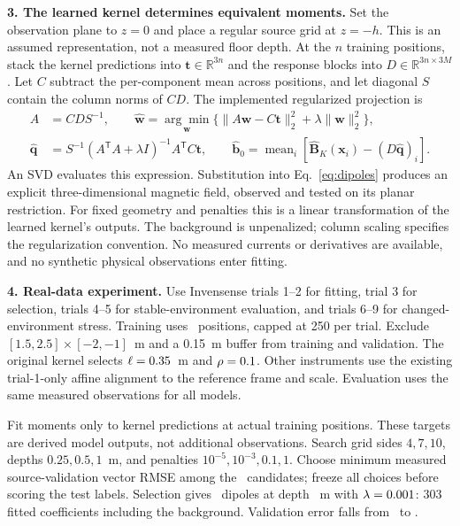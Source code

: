 \documentclass[11pt,letterpaper]{article}
\begin{document}
\newpage
\textbf{3. The learned kernel determines equivalent moments.}
Set the observation plane to $z=0$ and place a regular source grid at $z=-h$.
This is an assumed representation, not a measured floor depth. At the $n$ training
positions, stack the kernel predictions into $\mathbf t\in\mathbb R^{3n}$ and the
response blocks into $D\in\mathbb R^{3n\times3M}$.
Let $C$ subtract the per-component mean across positions, and let diagonal $S$
contain the column norms of $CD$. The implemented regularized projection is
\begin{align}
A&=CDS^{-1},\qquad
\widehat{\mathbf w}=
\underset{\mathbf w}{\arg\min}\bigl\{\|A\mathbf w-C\mathbf t\|_2^2
+\lambda\|\mathbf w\|_2^2\bigr\},\nonumber\\
\widehat{\mathbf q}&=S^{-1}(A^{\mathsf T}A+\lambda I)^{-1}A^{\mathsf T}C\mathbf t,
\qquad
\widehat{\mathbf b}_0=\operatorname{mean}_i
\left[\widehat{\mathbf B}_K(\mathbf x_i)-(D\widehat{\mathbf q})_i\right].
\label{eq:projection}
\end{align}
An SVD evaluates this expression. Substitution into Eq.~\eqref{eq:dipoles} produces
an explicit three-dimensional magnetic field, observed and tested on its planar
restriction. For fixed geometry and penalties this is a linear transformation
of the learned kernel's outputs. The background is unpenalized; column scaling
specifies the regularization convention. No measured currents or derivatives
are available, and no synthetic physical observations enter fitting.

\textbf{4. Real-data experiment.}
Use Invensense trials 1--2 for fitting, trial 3 for selection, trials 4--5 for
stable-environment evaluation, and trials 6--9 for changed-environment stress.
Training uses \TrainCount\ positions, capped at 250 per trial. Exclude
$[1.5,2.5]\times[-2,-1]$~m and a 0.15~m buffer from training and validation.
The original kernel selects $\ell=0.35$~m and $\rho=0.1$.
Other instruments use the existing trial-1-only affine alignment to the reference
frame and scale. Evaluation uses the same measured observations for all models.

Fit moments only to kernel predictions at actual training positions. These targets
are derived model outputs, not additional observations. Search grid sides
$4,7,10$, depths $0.25,0.5,1$~m, and penalties $10^{-5},10^{-3},0.1,1$.
Choose minimum measured source-validation vector RMSE among the \CandidateCount\ candidates;
freeze all choices before scoring the test labels. Selection gives
\SourceCount\ dipoles at depth \Depth~m with $\lambda=0.001$: 303 fitted
coefficients including the background. Validation error falls from
\TeacherValidation\ to \DipoleValidation.
\end{document}
